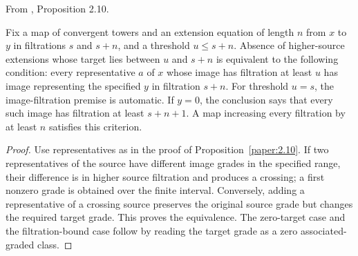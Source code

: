\begin{theorem}
\label{sem:ProofTools:representative-criterion}
From \cite{LWX126}, Proposition 2.10.\par

Fix a map of convergent towers and an extension equation of length $n$ from $x$ to $y$ in filtrations $s$ and $s+n$, and a threshold $u\leq s+n$. Absence of higher-source extensions whose target lies between $u$ and $s+n$ is equivalent to the following condition: every representative $a$ of $x$ whose image has filtration at least $u$ has image representing the specified $y$ in filtration $s+n$. For threshold $u=s$, the image-filtration premise is automatic. If $y=0$, the conclusion says that every such image has filtration at least $s+n+1$. A map increasing every filtration by at least $n$ satisfies this criterion.
\end{theorem}
\begin{proof}
Use representatives as in the proof of Proposition~\ref{paper:2.10}. If two representatives of the source have different image grades in the specified range, their difference is in higher source filtration and produces a crossing; a first nonzero grade is obtained over the finite interval. Conversely, adding a representative of a crossing source preserves the original source grade but changes the required target grade. This proves the equivalence. The zero-target case and the filtration-bound case follow by reading the target grade as a zero associated-graded class.
\end{proof}

